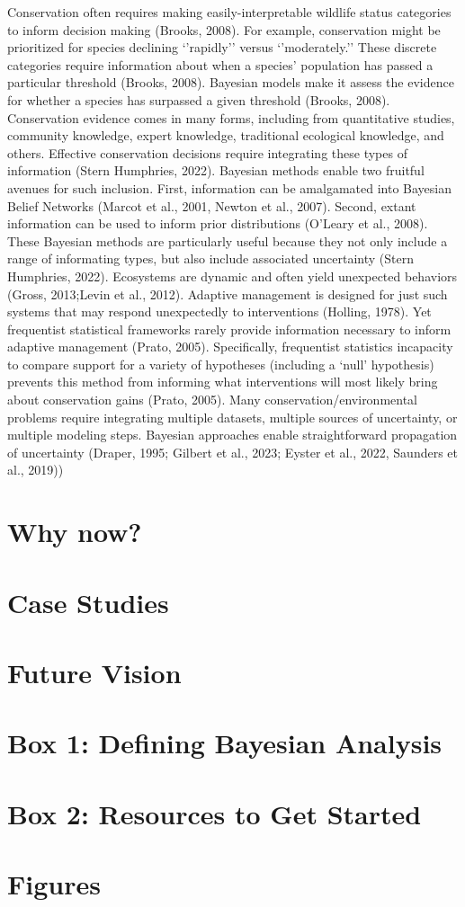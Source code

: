 \documentclass{article}
\begin{document}
Conservation often requires making easily-interpretable wildlife status categories to inform decision making (Brooks, 2008). For example, conservation might be prioritized for species declining ‘’rapidly’’ versus ‘’moderately.’’ These discrete categories require information about when a species’ population has passed a particular threshold (Brooks, 2008).  Bayesian models make it assess the evidence for whether a species has surpassed a given threshold (Brooks, 2008). 
Conservation evidence comes in many forms, including from quantitative studies, community knowledge, expert knowledge, traditional ecological knowledge, and others. Effective conservation decisions require integrating these types of information (Stern Humphries, 2022). Bayesian methods enable two fruitful avenues for such inclusion. First, information can be amalgamated into Bayesian Belief Networks (Marcot et al., 2001, Newton et al., 2007). Second, extant information can be used to inform prior distributions (O’Leary et al., 2008). These Bayesian methods are particularly useful because they not only include a range of informating types, but also include associated uncertainty (Stern Humphries, 2022). 
Ecosystems are dynamic and often yield unexpected behaviors (Gross, 2013;Levin et al., 2012). Adaptive management is designed for just such systems that may respond unexpectedly to interventions (Holling, 1978). Yet frequentist statistical frameworks rarely provide information necessary to inform adaptive management  (Prato, 2005).  Specifically, frequentist statistics incapacity to compare support for a variety of hypotheses (including a ‘null’ hypothesis) prevents this method from informing what interventions will most likely bring about conservation gains (Prato, 2005). 
Many conservation/environmental problems require integrating multiple datasets, multiple sources of uncertainty, or multiple modeling steps.  Bayesian approaches enable straightforward propagation of  uncertainty (Draper, 1995; Gilbert et al., 2023; Eyster et al., 2022, Saunders et al., 2019)) 


\section* {Why now?}
\section* {Case Studies}

\section* {Future Vision}
\section* {Box 1: Defining Bayesian Analysis}
\section* {Box 2: Resources to Get Started}

\section* {Figures}

\end{document}
